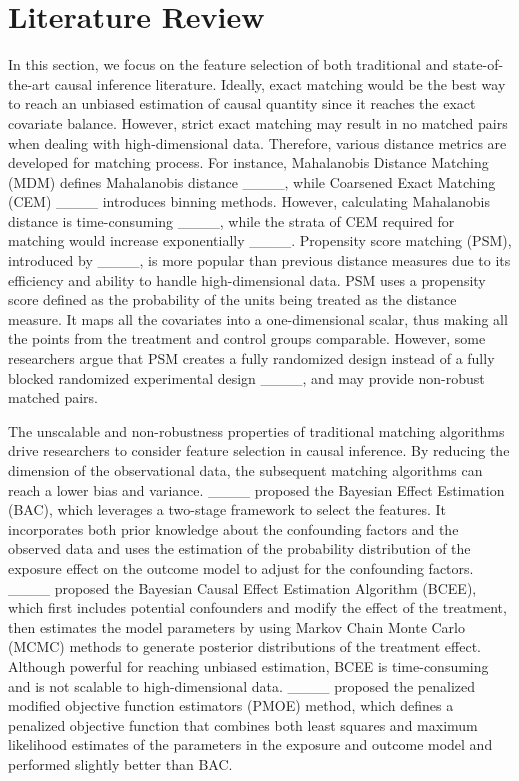 \section{Literature Review}

In this section, we focus on the feature selection of both traditional and state-of-the-art causal inference literature. Ideally, exact matching would be the best way to reach an unbiased estimation of causal quantity since it reaches the exact covariate balance. However, strict exact matching may result in no matched pairs when dealing with high-dimensional data. Therefore, various distance metrics are developed for matching process. For instance, Mahalanobis Distance Matching (MDM) defines Mahalanobis distance ____, while Coarsened Exact Matching (CEM) ____ introduces binning methods. However, calculating Mahalanobis distance is time-consuming ____, while the strata of CEM required for matching would increase exponentially ____. Propensity score matching (PSM), introduced by ____, is more popular than previous distance measures due to its efficiency and ability to handle high-dimensional data. PSM uses a propensity score defined as the probability of the units being treated as the distance measure. It maps all the covariates into a one-dimensional scalar, thus making all the points from the treatment and control groups comparable. However, some researchers argue that PSM creates a fully randomized design instead of a fully blocked randomized experimental design ____, and may provide non-robust matched pairs.

The unscalable and non-robustness properties of traditional matching algorithms drive researchers to consider feature selection in causal inference. By reducing the dimension of the observational data, the subsequent matching algorithms can reach a lower bias and variance. ____ proposed the Bayesian Effect Estimation (BAC), which leverages a two-stage framework to select the features. It incorporates both prior knowledge about the confounding factors and the observed data and uses the estimation of the probability distribution of the exposure effect on the outcome model to adjust for the confounding factors. ____ proposed the Bayesian Causal Effect Estimation Algorithm (BCEE), which first includes potential confounders and modify the effect of the treatment, then estimates the model parameters by using Markov Chain Monte Carlo (MCMC) methods to generate posterior distributions of the treatment effect. Although powerful for reaching unbiased estimation, BCEE is time-consuming and is not scalable to high-dimensional data. ____ proposed the penalized modified objective function estimators (PMOE) method, which defines a penalized objective function that combines both least squares and maximum likelihood estimates of the parameters in the exposure and outcome model and performed slightly better than BAC.

